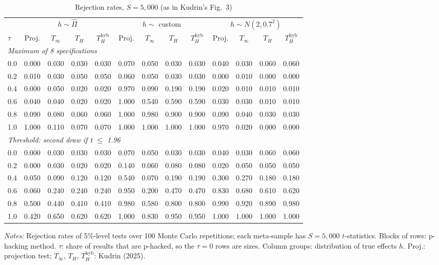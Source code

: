 \begin{table}[htbp]
\centering
\caption{Rejection rates, $S = 5{,}000$ (as in Kudrin's Fig.~3)}
\label{tab:kudrin_style_var_dial_plus_gammahat_S5000}
\footnotesize
\setlength{\tabcolsep}{4pt}
\begin{tabular}{lcccccccccccc}
\toprule
 & \multicolumn{4}{c}{$h \sim \hat{\Pi}$} & \multicolumn{4}{c}{$h \sim$ custom} & \multicolumn{4}{c}{$h \sim N(2, 0.7^2)$} \\
\cmidrule(lr){2-5} \cmidrule(lr){6-9} \cmidrule(lr){10-13}
$\tau$ & Proj. & $T_\infty$ & $T_H$ & $T_H^{\mathrm{hyb}}$ & Proj. & $T_\infty$ & $T_H$ & $T_H^{\mathrm{hyb}}$ & Proj. & $T_\infty$ & $T_H$ & $T_H^{\mathrm{hyb}}$ \\
\midrule
\multicolumn{13}{l}{\textit{Maximum of 8 specifications}} \\
0.0 & 0.000 & 0.030 & 0.030 & 0.030 & 0.070 & 0.050 & 0.030 & 0.030 & 0.040 & 0.030 & 0.060 & 0.060 \\
0.2 & 0.010 & 0.030 & 0.050 & 0.050 & 0.060 & 0.050 & 0.030 & 0.030 & 0.000 & 0.010 & 0.000 & 0.000 \\
0.4 & 0.000 & 0.050 & 0.020 & 0.020 & 0.970 & 0.090 & 0.190 & 0.190 & 0.020 & 0.010 & 0.010 & 0.010 \\
0.6 & 0.040 & 0.040 & 0.020 & 0.020 & 1.000 & 0.540 & 0.590 & 0.590 & 0.030 & 0.030 & 0.010 & 0.010 \\
0.8 & 0.090 & 0.080 & 0.060 & 0.060 & 1.000 & 0.980 & 0.900 & 0.900 & 0.090 & 0.040 & 0.030 & 0.030 \\
1.0 & 1.000 & 0.110 & 0.070 & 0.070 & 1.000 & 1.000 & 1.000 & 1.000 & 0.970 & 0.020 & 0.000 & 0.000 \\
\midrule
\multicolumn{13}{l}{\textit{Threshold: second draw if t $\le$ 1.96}} \\
0.0 & 0.000 & 0.030 & 0.030 & 0.030 & 0.070 & 0.050 & 0.030 & 0.030 & 0.040 & 0.030 & 0.060 & 0.060 \\
0.2 & 0.000 & 0.030 & 0.020 & 0.020 & 0.140 & 0.060 & 0.080 & 0.080 & 0.020 & 0.050 & 0.050 & 0.050 \\
0.4 & 0.050 & 0.090 & 0.120 & 0.120 & 0.540 & 0.070 & 0.190 & 0.190 & 0.300 & 0.270 & 0.180 & 0.180 \\
0.6 & 0.060 & 0.240 & 0.240 & 0.240 & 0.950 & 0.200 & 0.470 & 0.470 & 0.830 & 0.680 & 0.610 & 0.620 \\
0.8 & 0.500 & 0.440 & 0.410 & 0.410 & 0.980 & 0.580 & 0.800 & 0.800 & 0.990 & 0.920 & 0.890 & 0.980 \\
1.0 & 0.420 & 0.650 & 0.620 & 0.620 & 1.000 & 0.830 & 0.950 & 0.950 & 1.000 & 1.000 & 1.000 & 1.000 \\
\bottomrule
\end{tabular}
\par\smallskip
\begin{minipage}{\linewidth}\footnotesize\textit{Notes:} Rejection rates of 5\%-level tests over 100 Monte Carlo repetitions; each meta-sample has $S = 5{,}000$ $t$-statistics. Blocks of rows: p-hacking method. $\tau$: share of results that are p-hacked, so the $\tau = 0$ rows are sizes. Column groups: distribution of true effects $h$. Proj.: projection test; $T_\infty$, $T_H$, $T_H^{\mathrm{hyb}}$: Kudrin (2025).\end{minipage}
\end{table}
